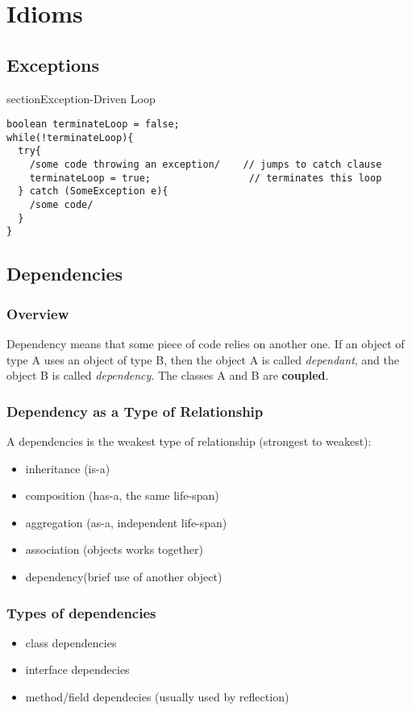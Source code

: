 \documentclass{report}
\begin{document}
\part{Idioms}



\chapter{Exceptions}
section{Exception-Driven Loop}
\begin{verbatim}
boolean terminateLoop = false;
while(!terminateLoop){
  try{
    /some code throwing an exception/    // jumps to catch clause
    terminateLoop = true;                 // terminates this loop
  } catch (SomeException e){
    /some code/
  }
}
\end{verbatim}








\chapter{Dependencies}
\section{Overview}
Dependency means that some piece of code relies on another one. If an object of type A uses an object of type B, 
then the object A is called \textit{dependant}, and the object B is called \textit{dependency}. The classes A and B are \textbf{coupled}. 

\section{Dependency as a Type of Relationship}
A dependencies is the weakest
type of relationship (strongest to weakest):
\begin{itemize}
	\item inheritance (is-a)
	\item composition (has-a, the same life-span)
	\item aggregation (as-a, independent life-span)
	\item association (objects works together)
	\item dependency(brief use of another object)
\end{itemize}

\section{Types of dependencies}
\begin{itemize}
	\item class dependencies
	\item interface dependecies
	\item method/field dependecies (usually used by reflection)
\end{itemize}
\end{document}
